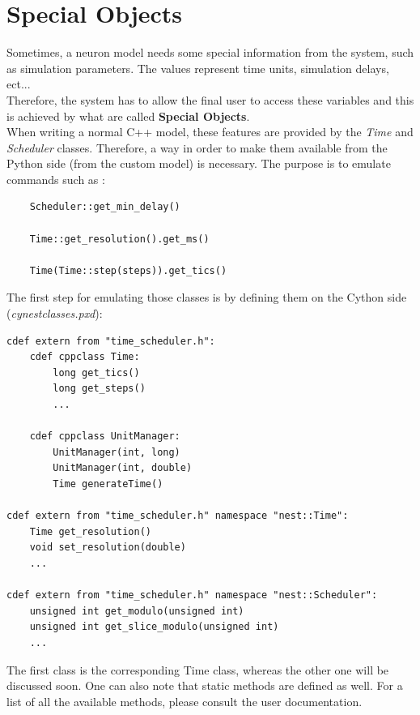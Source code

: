 \documentclass{article}
\begin{document}
\section{Special Objects}
Sometimes, a neuron model needs some special information from the system, such as simulation parameters. The values represent time units, simulation delays, ect...\\
Therefore, the system has to allow the final user to access these variables and this is achieved by what are called \textbf{Special Objects}. \\
When writing a normal C++ model, these features are provided by the \emph{Time} and \emph{Scheduler} classes. Therefore, a way in order to make them available from the Python side (from the custom model) is necessary. The purpose is to emulate commands such as :
\begin{verbatim}
    Scheduler::get_min_delay()

    Time::get_resolution().get_ms()

    Time(Time::step(steps)).get_tics()
\end{verbatim}
The first step for emulating those classes is by defining them on the Cython side (\emph{cynest\/classes.pxd}):
\begin{verbatim}
cdef extern from "time_scheduler.h":
    cdef cppclass Time:
        long get_tics()
        long get_steps()
        ...

    cdef cppclass UnitManager:
        UnitManager(int, long)
        UnitManager(int, double)
        Time generateTime()

cdef extern from "time_scheduler.h" namespace "nest::Time":
    Time get_resolution()
    void set_resolution(double)
    ...
    
cdef extern from "time_scheduler.h" namespace "nest::Scheduler":
    unsigned int get_modulo(unsigned int)
    unsigned int get_slice_modulo(unsigned int)
    ...
\end{verbatim}
The first class is the corresponding Time class, whereas the other one will be discussed soon. One can also note that static methods are defined as well. For a list of all the available methods, please consult the user documentation. \\ \\
\end{document}
